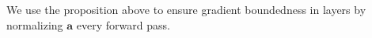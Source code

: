 We use the proposition above to ensure gradient boundedness in \ourmethod{} layers by normalizing $\boldsymbol{a}$ every forward pass. 







